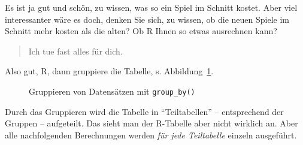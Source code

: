 \documentclass[
  a4paper,
]{scrbook}
\theoremstyle{definition}
\theoremstyle{definition}
\theoremstyle{definition}
\theoremstyle{remark}
\begin{document}
Es ist ja gut und schön, zu wissen, was so ein Spiel im Schnitt kostet.
Aber viel interessanter wäre es doch, denken Sie sich, zu wissen, ob die
neuen Spiele im Schnitt mehr kosten als die alten? Ob R Ihnen so etwas
ausrechnen kann?

\begin{quote}
{} Ich tue fast alles für dich. {}
\end{quote}

Also gut, R, dann gruppiere die Tabelle, s. Abbildung~\ref{fig-group}.

\begin{figure}


\caption{\label{fig-group}Gruppieren von Datensätzen mit
\texttt{group\_by()}}

\end{figure}%

Durch das Gruppieren wird die Tabelle in ``Teiltabellen'' --
entsprechend der Gruppen -- aufgeteilt. Das sieht man der R-Tabelle aber
nicht wirklich an. Aber alle nachfolgenden Berechnungen werden \emph{für
jede Teiltabelle} einzeln ausgeführt.
\end{document}
